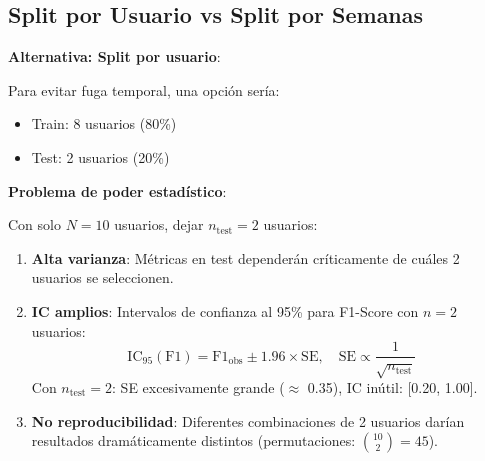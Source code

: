 \documentclass[12pt,letterpaper,twoside]{report}
\begin{document}
\subsection{Split por Usuario vs Split por Semanas}

\begin{estadisticobox}
\textbf{Alternativa: Split por usuario}:

Para evitar fuga temporal, una opción sería:
\begin{itemize}[noitemsep]
    \item Train: 8 usuarios (80\%)
    \item Test: 2 usuarios (20\%)
\end{itemize}

\textbf{Problema de poder estadístico}:

Con solo $N=10$ usuarios, dejar $n_{\text{test}}=2$ usuarios:

\begin{enumerate}[noitemsep]
    \item \textbf{Alta varianza}: Métricas en test dependerán críticamente de cuáles 2 usuarios se seleccionen.
    
    \item \textbf{IC amplios}: Intervalos de confianza al 95\% para F1-Score con $n=2$ usuarios:
    \begin{equation}
    \text{IC}_{95}(\text{F1}) = \text{F1}_{\text{obs}} \pm 1.96 \times \text{SE}, \quad \text{SE} \propto \frac{1}{\sqrt{n_{\text{test}}}}
    \end{equation}
    Con $n_{\text{test}}=2$: SE excesivamente grande ($\approx$ 0.35), IC inútil: [0.20, 1.00].
    
    \item \textbf{No reproducibilidad}: Diferentes combinaciones de 2 usuarios darían resultados dramáticamente distintos (permutaciones: $\binom{10}{2}=45$).
\end{enumerate}
\end{estadisticobox}
\end{document}
